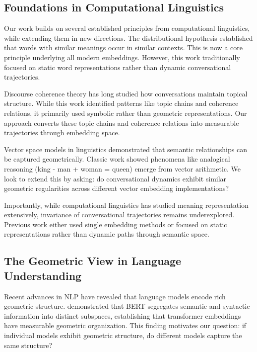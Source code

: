 \documentclass[11pt,letterpaper]{article}
\begin{document}
\subsection{Foundations in Computational Linguistics}

Our work builds on several established principles from computational linguistics, while extending them in new directions. The distributional hypothesis \citep{harris1954distributional, firth1957papers} established that words with similar meanings occur in similar contexts. This is now a core principle underlying all modern embeddings. However, this work traditionally focused on static word representations rather than dynamic conversational trajectories.

Discourse coherence theory \citep{grosz1995centering, kehler2002coherence} has long studied how conversations maintain topical structure. While this work identified patterns like topic chains and coherence relations, it primarily used symbolic rather than geometric representations. Our approach converts these topic chains and coherence relations into measurable trajectories through embedding space.

Vector space models in linguistics \citep{turney2010frequency, clark2015vector} demonstrated that semantic relationships can be captured geometrically. Classic work showed phenomena like analogical reasoning (king - man + woman = queen) emerge from vector arithmetic. We look to extend this by asking: do conversational dynamics exhibit similar geometric regularities across different vector embedding implementations?

Importantly, while computational linguistics has studied meaning representation extensively, invariance of conversational trajectories remains underexplored. Previous work either used single embedding methods or focused on static representations rather than dynamic paths through semantic space.

\subsection{The Geometric View in Language Understanding}

Recent advances in NLP have revealed that language models encode rich geometric structure. \citet{reif2019visualizing} demonstrated that BERT segregates semantic and syntactic information into distinct subspaces, establishing that transformer embeddings have measurable geometric organization. This finding motivates our question: if individual models exhibit geometric structure, do different models capture the same structure?
\end{document}
